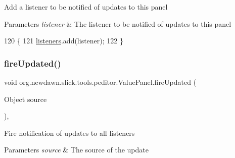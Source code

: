 Add a listener to be notified of updates to this panel


\begin{DoxyParams}{Parameters}
{\em listener} & The listener to be notified of updates to this panel \\
\hline
\end{DoxyParams}

\begin{DoxyCode}
120                                                          \{
121         \mbox{\hyperlink{classorg_1_1newdawn_1_1slick_1_1tools_1_1peditor_1_1_value_panel_ae8be70f5fbf496c47f1b1c5cb9e3c1fa}{listeners}}.add(listener);
122     \}
\end{DoxyCode}
\mbox{\label{classorg_1_1newdawn_1_1slick_1_1tools_1_1peditor_1_1_value_panel_a26186da0cc3082d426c54cc7cc94aefe}} 
\subsubsection{\texorpdfstring{fire\+Updated()}{fireUpdated()}}
{\footnotesize\ttfamily void org.\+newdawn.\+slick.\+tools.\+peditor.\+Value\+Panel.\+fire\+Updated (\begin{DoxyParamCaption}\item[{Object}]{source }\end{DoxyParamCaption})\hspace{0.3cm}{\ttfamily [inline]}, {\ttfamily [private]}}

Fire notification of updates to all listeners


\begin{DoxyParams}{Parameters}
{\em source} & The source of the update \\
\hline
\end{DoxyParams}

